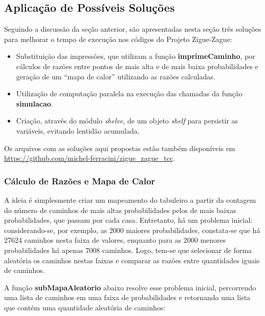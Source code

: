 \documentclass[12pt]{article}
\newcommand{\aspas}[1]{``#1''} %
\begin{document}
\subsection{Aplicação de Possíveis Soluções}
\label{solucoes}


Seguindo a discussão da seção anterior, são apresentadas nesta seção três soluções para melhorar o tempo de execução nos códigos do Projeto Zigue-Zague:

\begin{itemize}
	\item Substituição das impressões, que utilizam a função \textbf{imprimeCaminho}, por cálculos de razões entre pontos de mais alta e de mais baixa probabilidades e geração de um \aspas{mapa de calor} utilizando as razões calculadas.
	\item Utilização de computação paralela na execução das chamadas da função \textbf{simulacao}.
	\item Criação, através do módulo \textit{shelve}, de um objeto \textit{shelf} para persistir as variáveis, evitando lentidão acumulada. 
\end{itemize}

Os arquivos com as soluções aqui propostas estão também disponíveis  em \url{https://github.com/michel-ferracini/zigue_zague_tcc}.

\subsubsection{Cálculo de Razões e Mapa de Calor}
\label{mapas_calor}

A ideia é simplesmente criar um mapeamento do tabuleiro a partir da contagem do número de caminhos de mais altas probabilidades pelos de mais baixas probabilidades, que passam por cada casa. Entretanto, há um problema inicial: considerando-se, por exemplo, as 2000 maiores probabilidades, constata-se que há 27624 caminhos nesta faixa de valores, enquanto para as 2000 menores probabilidades há apenas 7008 caminhos. Logo, tem-se que selecionar de forma aleatória os caminhos nestas faixas e comparar as razões entre quantidades iguais de caminhos.

A função \textbf{subMapaAleatorio} abaixo resolve esse problema inicial, percorrendo uma lista de caminhos em uma faixa de probabilidades e retornando uma lista que contém uma quantidade aleatória de caminhos:
\end{document}
